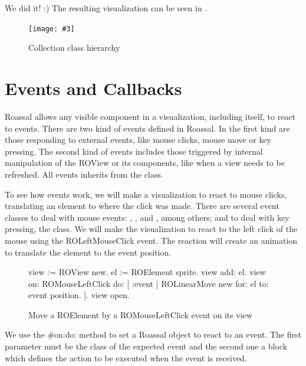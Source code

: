 \documentclass[a4paper,10pt,twoside]{book}
\newcommand{\fig}[4]{
		\begin{figure}[#1]
			\centering
			\texttt{[image: \#3]}
			\caption{\label{fig:#3}#4}
		\end{figure}}
\begin{document}
We did it! :)  The resulting visualization can be seen in .

\fig{H}{0.4}{collectionHierarchy}{Collection class hierarchy}


\section{Events and Callbacks}

Roassal allows any visible component in a visualization, including itself, to react to events. There are two kind of events defined in Roassal. In the first kind are those responding to external events, like mouse clicks, mouse move or key pressing. The second kind of events includes those triggered by internal manipulation of the ROView or its components, like when a view needs to be refreshed.
All events inherits from the  class.

To see how events work, we will make a visualization to react to mouse clicks, translating an element to where the click was made. 
There are several event classes to deal with mouse events: , ,  and , among others; and to deal with key pressing, the  class.
We will make the visualization to react to the left click of the mouse using the ROLeftMouseClick event. The reaction will create an animation to translate the element to the event position.

\begin{figure}[H]
      \begin{minipage}[t]{0.61\textwidth}
      \vspace{0pt}
     \begin{code}{}
view := ROView new.
el := ROElement sprite.
view add: el.
view 
	on: ROMouseLeftClick 
	do: [ :event | 
		ROLinearMove new
			for: el to: event position.
	].
view open. 
  \end{code}
   \end{minipage}
   \hfill
\caption{Move a ROElement by a ROMouseLeftClick event on its view}
\label{fig:mouseClick}
\end{figure} 

We use the \#on:do: method to set a Roassal object to react to an event. The first parameter must be the class of the expected event and the second one a block which defines the action to be executed when the event is received.
\end{document}
